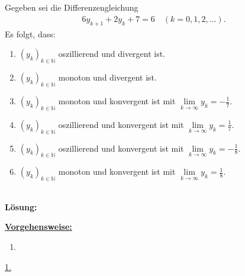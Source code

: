 \subsection*{}
Gegeben sei die Differenzengleichung
\begin{align*}
	6y_{k+1} + 2 y_k +7 = 6
	\quad (k = 0,1,2,...).
\end{align*}
Es folgt, dass:
\renewcommand{\labelenumi}{(\alph{enumi})}
\begin{enumerate}
	\item
	$ (y_k)_{k \in \mathbb{N}} $ oszillierend und divergent ist.
	\item
	$ (y_k)_{k \in \mathbb{N}} $ monoton und divergent ist.	
	\item 
	$ (y_k)_{k \in \mathbb{N}} $ monoton und konvergent ist mit $ \lim \limits_{k \to \infty} y_k = -\frac{1}{7} $.
	\item
	$ (y_k)_{k \in \mathbb{N}} $ oszillierend und konvergent ist mit $ \lim \limits_{k \to \infty} y_k = \frac{1}{7} $.
	\item 
	$ (y_k)_{k \in \mathbb{N}} $ oszillierend und konvergent ist mit $ \lim \limits_{k \to \infty} y_k = -\frac{1}{8} $.
	\item 
	$ (y_k)_{k \in \mathbb{N}} $ monoton und konvergent ist mit $ \lim \limits_{k \to \infty} y_k = \frac{1}{8} $.
\end{enumerate}
\ \\
\textbf{Lösung:}
\begin{mdframed}
\underline{\textbf{Vorgehensweise:}}
\renewcommand{\labelenumi}{\theenumi.}
\begin{enumerate}
\item 
\end{enumerate}
\end{mdframed}

\underline{1. }\\

